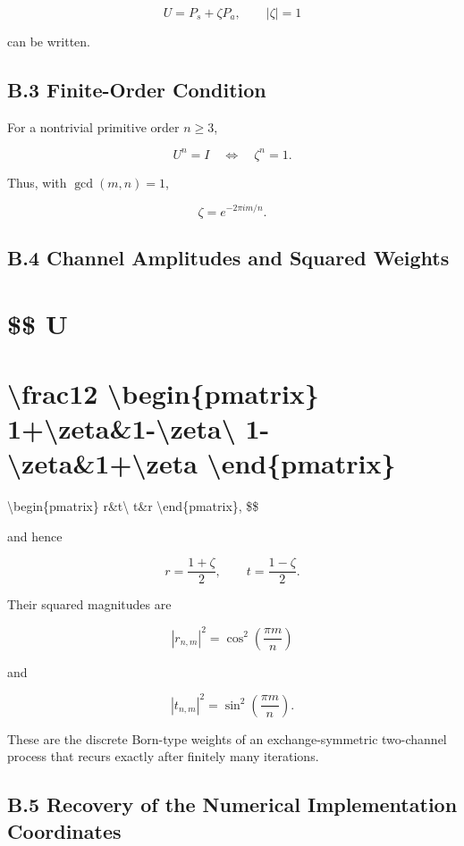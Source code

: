 \documentclass[
  a4paper,
  10pt]{article}
\begin{document}
\[
\boxed{
U=P_s+\zeta P_a,
\qquad |\zeta|=1
}
\]

can be written.

\subsection{B.3 Finite-Order Condition}\label{b3-finite-order-condition}

For a nontrivial primitive order \(n\ge3\),

\[
U^n=I
\quad\Longleftrightarrow\quad
\zeta^n=1.
\]

Thus, with \(\gcd(m,n)=1\),

\[
\zeta=e^{-2\pi im/n}.
\]

\subsection{B.4 Channel Amplitudes and Squared
Weights}\label{b4-channel-amplitudes-and-squared-weights}

\section{\$\$ U}\label{-u-1}

\section{\textbackslash frac12 \textbackslash begin\{pmatrix\}
1+\textbackslash zeta\&1-\textbackslash zeta\textbackslash{}
1-\textbackslash zeta\&1+\textbackslash zeta
\textbackslash end\{pmatrix\}}\label{frac12-beginpmatrix-1zeta1-zeta-1-zeta1zeta-endpmatrix-1}

\textbackslash begin\{pmatrix\} r\&t\textbackslash{} t\&r
\textbackslash end\{pmatrix\}, \$\$

and hence

\[
r=\frac{1+\zeta}{2},
\qquad
t=\frac{1-\zeta}{2}.
\]

Their squared magnitudes are

\[
\boxed{
|r_{n,m}|^2
=\cos^2\left(\frac{\pi m}{n}\right)
}
\]

and

\[
\boxed{
|t_{n,m}|^2
=\sin^2\left(\frac{\pi m}{n}\right)
}.
\]

These are the discrete Born-type weights of an exchange-symmetric
two-channel process that recurs exactly after finitely many iterations.

\subsection{B.5 Recovery of the Numerical Implementation
Coordinates}\label{b5-recovery-of-the-numerical-implementation-coordinates}
\end{document}
